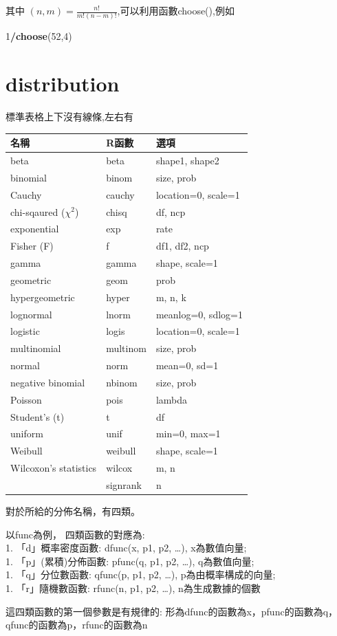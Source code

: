 \documentclass[]{book}
\newenvironment{Shaded}{\begin{snugshade}}{\end{snugshade}}
\newcommand{\DecValTok}[1]{\textcolor[rgb]{0.00,0.00,0.81}{#1}}
\newcommand{\KeywordTok}[1]{\textcolor[rgb]{0.13,0.29,0.53}{\textbf{#1}}}
\newcommand{\NormalTok}[1]{#1}
\newcommand{\OperatorTok}[1]{\textcolor[rgb]{0.81,0.36,0.00}{\textbf{#1}}}
\theoremstyle{definition}
\theoremstyle{definition}
\theoremstyle{definition}
\theoremstyle{remark}
\begin{document}
其中 \((n,m)=\frac{n!}{m!(n-m)!}\),可以利用函數choose(),例如

\begin{Shaded}
\begin{Highlighting}[]
\DecValTok{1}\OperatorTok{/}\KeywordTok{choose}\NormalTok{(}\DecValTok{52}\NormalTok{,}\DecValTok{4}\NormalTok{)}
\end{Highlighting}
\end{Shaded}

\hypertarget{distribution}{%
\section{distribution}\label{distribution}}

標準表格上下沒有線條,左右有

\begin{longtable}[]{@{}lll@{}}
\toprule
名稱 & R函數 & 選項\tabularnewline
\midrule
\endhead
beta & beta & shape1, shape2\tabularnewline
binomial & binom & size, prob\tabularnewline
Cauchy & cauchy & location=0, scale=1\tabularnewline
chi-sqaured (\(\chi^2\)) & chisq & df, ncp\tabularnewline
exponential & exp & rate\tabularnewline
Fisher (F) & f & df1, df2, ncp\tabularnewline
gamma & gamma & shape, scale=1\tabularnewline
geometric & geom & prob\tabularnewline
hypergeometric & hyper & m, n, k\tabularnewline
lognormal & lnorm & meanlog=0, sdlog=1\tabularnewline
logistic & logis & location=0, scale=1\tabularnewline
multinomial & multinom & size, prob\tabularnewline
normal & norm & mean=0, sd=1\tabularnewline
negative binomial & nbinom & size, prob\tabularnewline
Poisson & pois & lambda\tabularnewline
Student's (t) & t & df\tabularnewline
uniform & unif & min=0, max=1\tabularnewline
Weibull & weibull & shape, scale=1\tabularnewline
Wilcoxon's statistics & wilcox & m, n\tabularnewline
& signrank & n\tabularnewline
\bottomrule
\end{longtable}

對於所給的分佈名稱，有四類。

以func為例， 四類函數的對應為:\\
1. 「d」概率密度函數: dfunc(x, p1, p2, \ldots{}), x為數值向量;\\
1. 「p」(累積)分佈函數: pfunc(q, p1, p2, \ldots{}), q為數值向量;\\
1. 「q」分位數函數: qfunc(p, p1, p2, \ldots{}), p為由概率構成的向量;\\
1. 「r」隨機數函數: rfunc(n, p1, p2, \ldots{}), n為生成數據的個數

這四類函數的第一個參數是有規律的:
形為dfunc的函數為x，pfunc的函數為q，qfunc的函數為p，rfunc的函數為n
\end{document}
